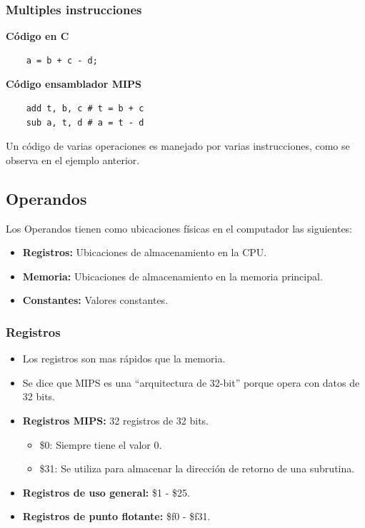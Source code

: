 \documentclass{templateNote}
\begin{document}
\subsubsection{Multiples instrucciones}
\begin{tcolorbox}[colback=gray!5!white, colframe=gray!75!black, title={Código de ejemplo en C y ensamblador MIPS}]
    \begin{minipage}{0.45\textwidth}
        \textbf{Código en C}
        \begin{lstlisting}
    a = b + c - d; 
        \end{lstlisting}
    \end{minipage}
    \hfill
    \begin{minipage}{0.45\textwidth}
        \textbf{Código ensamblador MIPS}
        \begin{lstlisting}
    add t, b, c # t = b + c
    sub a, t, d # a = t - d
        \end{lstlisting}
    \end{minipage}
\end{tcolorbox}

\noindent Un código de varias operaciones es manejado por varias instrucciones, como se observa en el ejemplo anterior.

\subsection{Operandos}
\noindent Los Operandos tienen como ubicaciones físicas en el computador las siguientes:
\begin{itemize}
    \item \textbf{Registros:} Ubicaciones de almacenamiento en la CPU.
    \item \textbf{Memoria:} Ubicaciones de almacenamiento en la memoria principal.
    \item \textbf{Constantes:} Valores constantes.
\end{itemize}

\subsubsection{Registros}
\begin{itemize}
    \item Los registros son mas rápidos que la memoria.
    \item Se dice que MIPS es una ``arquitectura de 32-bit'' porque opera con datos de 32 bits.
    \item \textbf{Registros MIPS:} 32 registros de 32 bits.
    \begin{itemize}
        \item \$0: Siempre tiene el valor 0.
        \item \$31: Se utiliza para almacenar la dirección de retorno de una subrutina.
    \end{itemize}
    \item \textbf{Registros de uso general:} \$1 - \$25.
    \item \textbf{Registros de punto flotante:} \$f0 - \$f31.
\end{itemize}
\end{document}
